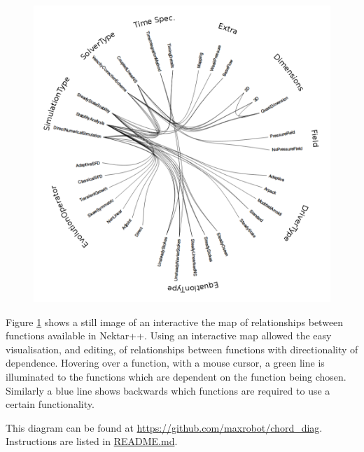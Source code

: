 \documentclass[11pt, a4paper]{report}
\begin{document}
\begin{figure}[htb!]
 \centering
 \includegraphics[width=.9\linewidth,  clip=true, trim = 0cm 0cm 0cm 0cm]{constraint_mapping}
 \label{fig:constraint_mapping}
\end{figure}

Figure \ref{fig:constraint_mapping} shows a still image of an interactive the map of relationships between functions available in Nektar++. Using an interactive map allowed the easy visualisation, and editing, of relationships between functions with directionality of dependence. Hovering over a function, with a mouse cursor, a green line is illuminated to the functions which are dependent on the function being chosen. Similarly a blue line shows backwards which functions are required to use a certain functionality.

This diagram can be found at \url{https://github.com/maxrobot/chord_diag}. Instructions are listed in \url{README.md}.
\end{document}
